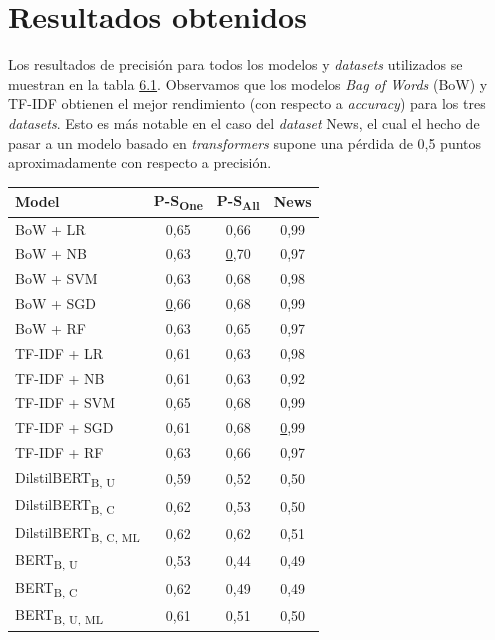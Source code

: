 \section{Resultados obtenidos}
\label{sec:results}

Los resultados de precisión para todos los modelos y \textit{datasets} utilizados se muestran en la tabla \hyperref[tab:acc]{6.1}. Observamos que los modelos \emph{Bag of Words} (BoW) y TF-IDF obtienen el mejor rendimiento (con respecto a \emph{accuracy}) para los tres \textit{datasets}. Esto es más notable en el caso del \textit{dataset} News, el cual el hecho de pasar a un modelo basado en \emph{transformers} supone una pérdida de 0,5 puntos aproximadamente con respecto a precisión.

\begin{table}[!h]
    \begin{center}
    \begin{tabular}{lccc}
        \textbf{Model} & \multicolumn{1}{c}{\textbf{P-S\textsubscript{One}}} & \multicolumn{1}{c}{\textbf{P-S\textsubscript{All}}} & \multicolumn{1}{c}{\textbf{News}} \\ \hline
        {BoW + LR} & 0,65 & 0,66 & 0,99 \\
        {BoW + NB} & 0,63 & {\ul 0,70} & 0,97 \\
        {BoW + SVM} & 0,63 & 0,68 & 0,98 \\
        {BoW + SGD} & {\ul 0,66} & 0,68 & 0,99 \\
        {BoW + RF} & 0,63 & 0,65 & 0,97 \\ \hline
        {TF-IDF + LR} & 0,61 & 0,63 & 0,98 \\
        {TF-IDF + NB} & 0,61 & 0,63 & 0,92 \\
        {TF-IDF + SVM} & 0,65 & 0,68 & 0,99 \\
        {TF-IDF + SGD} & 0,61 & 0,68 & {\ul 0,99} \\
        {TF-IDF + RF} & 0,63 & 0,66 & 0,97 \\ \hline
        {DilstilBERT}\textsubscript{B, U} & 0,59 & 0,52 & 0,50 \\
        {DilstilBERT}\textsubscript{B, C} & 0,62 & 0,53 & 0,50 \\
        {DilstilBERT}\textsubscript{B, C, ML} & 0,62 & 0,62 & 0,51 \\ \hline
        {BERT}\textsubscript{B, U} & 0,53 & 0,44 & 0,49 \\
        {BERT}\textsubscript{B, C} & 0,62 & 0,49 & 0,49 \\
        {BERT}\textsubscript{B, U, ML} & 0,61 & 0,51 & 0,50 \\

\end{tabular}
\end{center}
\end{table}
